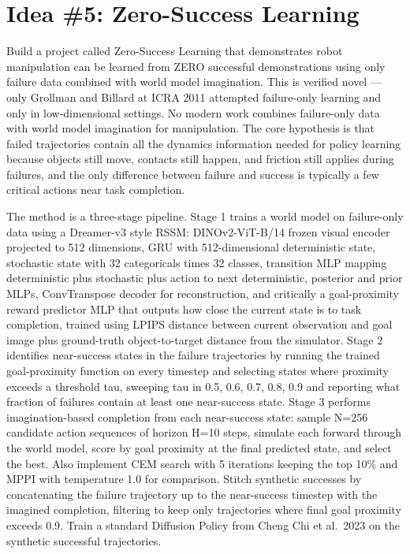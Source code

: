 \documentclass[11pt,a4paper]{article}
\begin{document}
\section{Idea \#5: Zero-Success Learning}

Build a project called Zero-Success Learning that demonstrates robot manipulation can be learned from ZERO successful demonstrations using only failure data combined with world model imagination. This is verified novel --- only Grollman and Billard at ICRA 2011 attempted failure-only learning and only in low-dimensional settings. No modern work combines failure-only data with world model imagination for manipulation. The core hypothesis is that failed trajectories contain all the dynamics information needed for policy learning because objects still move, contacts still happen, and friction still applies during failures, and the only difference between failure and success is typically a few critical actions near task completion.

The method is a three-stage pipeline. Stage 1 trains a world model on failure-only data using a Dreamer-v3 style RSSM: DINOv2-ViT-B/14 frozen visual encoder projected to 512 dimensions, GRU with 512-dimensional deterministic state, stochastic state with 32 categoricals times 32 classes, transition MLP mapping deterministic plus stochastic plus action to next deterministic, posterior and prior MLPs, ConvTranspose decoder for reconstruction, and critically a goal-proximity reward predictor MLP that outputs how close the current state is to task completion, trained using LPIPS distance between current observation and goal image plus ground-truth object-to-target distance from the simulator. Stage 2 identifies near-success states in the failure trajectories by running the trained goal-proximity function on every timestep and selecting states where proximity exceeds a threshold tau, sweeping tau in 0.5, 0.6, 0.7, 0.8, 0.9 and reporting what fraction of failures contain at least one near-success state. Stage 3 performs imagination-based completion from each near-success state: sample N=256 candidate action sequences of horizon H=10 steps, simulate each forward through the world model, score by goal proximity at the final predicted state, and select the best. Also implement CEM search with 5 iterations keeping the top 10\% and MPPI with temperature 1.0 for comparison. Stitch synthetic successes by concatenating the failure trajectory up to the near-success timestep with the imagined completion, filtering to keep only trajectories where final goal proximity exceeds 0.9. Train a standard Diffusion Policy from Cheng Chi et al.\ 2023 on the synthetic successful trajectories.
\end{document}
